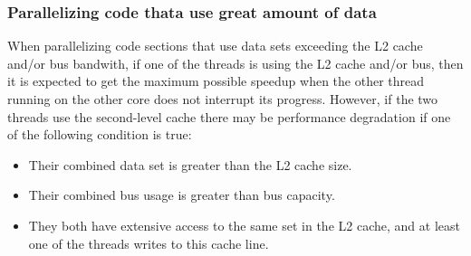 \subsubsection{Parallelizing code thata use great amount of data}
When parallelizing code sections that use data sets exceeding the L2 cache and/or bus bandwith, if one of the threads is using the L2 cache and/or bus, then it is expected to get the maximum possible speedup when the other thread running on the other core does not interrupt its progress. However, if the two threads use the second-level cache there may be performance degradation if one of the following condition is true:
\begin{itemize}
	\item Their combined data set is greater than the L2 cache size.
	\item Their combined bus usage is greater than bus capacity.
	\item They both have extensive access to the same set in the L2 cache, and at least one of the threads writes to this cache line.
\end{itemize}